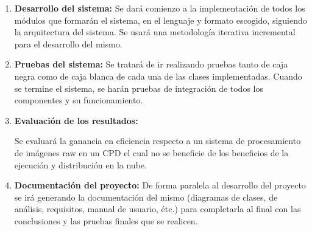\begin{enumerate}
\item\textbf{Desarrollo del sistema:}
Se dará comienzo a la implementación de todos los módulos que formarán el sistema, en el lenguaje y formato escogido, siguiendo la arquitectura del sistema.
Se usará una metodología iterativa incremental para el desarrollo del mismo.

\item \textbf{Pruebas del sistema:}
Se tratará de ir realizando pruebas tanto de caja negra como de caja blanca de cada una de las clases implementadas.
Cuando se termine el sistema, se harán pruebas de integración de todos los componentes y su funcionamiento.

\item\textbf{Evaluación de los resultados:}

Se evaluará la ganancia en eficiencia respecto a un sistema de procesamiento de imágenes raw en un CPD el cual no se beneficie de los beneficios de la ejecución y distribución en la nube.


\item\textbf{Documentación del proyecto:}
De forma paralela al desarrollo del proyecto se irá generando la documentación del mismo (diagramas de clases, de análisis, requisitos, manual de usuario, étc.) para completarla al final con las conclusiones y las
pruebas finales que se realicen.


\end{enumerate}







